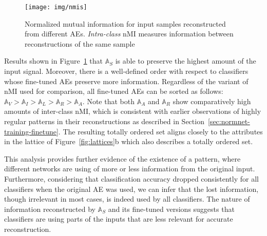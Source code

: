 \documentclass[10pt,twocolumn,a4paper]{article}
\newcommand{\autoe}[1]{\mathbb{A}_{#1}}
\begin{document}
\begin{figure}
	\texttt{[image: img/nmis]}
	\caption{Normalized mutual information for input samples reconstructed from different AEs. \textit{Intra-class} nMI measures information between reconstructions of the same sample}
	\label{fig:nmi}
\end{figure}

Results shown in Figure~\ref{fig:nmi} that $\autoe{S}$ is able to preserve the highest amount of the input signal.
Moreover, there is a well-defined order with respect to classifiers whose fine-tuned AEs preserve more information.
Regardless of the variant of nMI used for comparison, all fine-tuned AEs can be sorted as follows: $\autoe{V} > \autoe{I} > \autoe{L} > \autoe{R} > \autoe{A}$.
Note that both $\autoe{A}$ and $\autoe{R}$ show comparatively high amounts of inter-class nMI, which is consistent with earlier observations of highly regular patterns in their reconstructions as described in Section~\ref{sec:normnet-training-finetune}.
The resulting totally ordered set aligns closely to the attributes in the lattice of Figure~\ref{fig:lattices}b which also describes a totally ordered set.

This analysis provides further evidence of the existence of a pattern, where different networks are using of more or less information from the original input.
Furthermore, considering that classification accuracy dropped consistently for all classifiers when the original AE was used, we can infer that the lost information, though irrelevant in most cases, is indeed used by all classifiers.
The nature of information reconstructed by $\autoe{S}$ and its fine-tuned versions suggests that classifiers are using parts of the inputs that are less relevant for accurate reconstruction.
\end{document}
